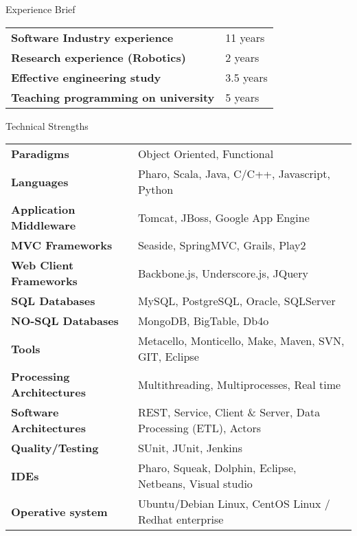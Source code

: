 \documentclass{resume} %
\begin{document}
\begin{rSection}{Experience Brief}

\begin{tabular}{ @{} >{\bfseries}l @{\hspace{6ex}} l }

Software Industry experience & 11 years \\
Research experience (Robotics) & 2 years \\
Effective engineering study & 3.5 years \\
Teaching programming on university & 5 years \\

\end{tabular}
\end{rSection}
\begin{rSection}{Technical Strengths}

\begin{tabular}{ @{} >{\bfseries}l @{\hspace{6ex}} l }
Paradigms & Object Oriented, Functional \\
Languages & Pharo, Scala, Java, C/C++, Javascript, Python  \\
Application Middleware & Tomcat, JBoss, Google App Engine \\
MVC Frameworks &  Seaside, SpringMVC, Grails, Play2 \\
Web Client Frameworks & Backbone.js, Underscore.js, JQuery \\
SQL Databases & MySQL, PostgreSQL, Oracle, SQLServer  \\
NO-SQL Databases & MongoDB, BigTable, Db4o  \\
Tools & Metacello, Monticello, Make, Maven, SVN, GIT, Eclipse \\
Processing Architectures & Multithreading, Multiprocesses, Real time \\
Software Architectures & REST, Service,  Client \& Server, Data Processing (ETL), Actors\\
Quality/Testing & SUnit, JUnit, Jenkins \\
IDEs & Pharo, Squeak, Dolphin, Eclipse, Netbeans, Visual studio \\
Operative system & Ubuntu/Debian Linux, CentOS Linux / Redhat enterprise \\
\end{tabular}

\end{rSection}
\end{document}

